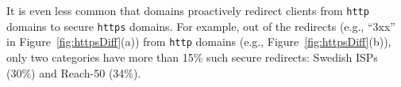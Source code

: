 \documentclass[letterpaper]{sig-alternate-10pt}
\begin{document}

%



It is even less common that domains proactively redirect clients from 
\texttt{http} domains to secure \texttt{https} domains.
For example, out of the redirects (e.g., ``3xx'' in Figure~\ref{fig:httpsDiff}(a))
from \texttt{http} domains (e.g., Figure~\ref{fig:httpsDiff}(b)),
only two categories have more than 15\% such secure redirects:
Swedish ISPs (30\%) and Reach-50 (34\%).

\end{document}
